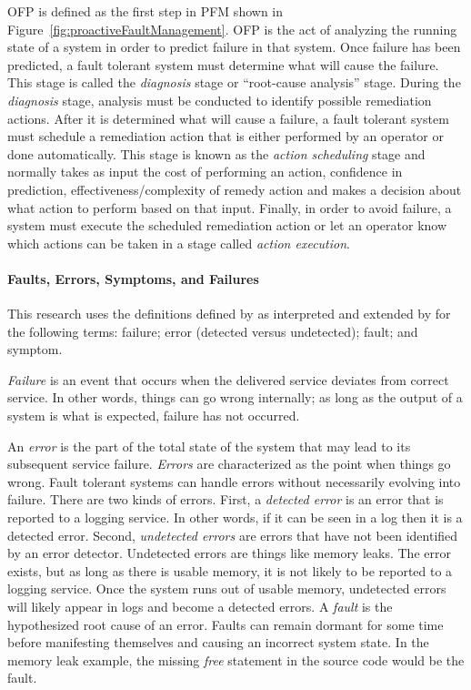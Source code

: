 
\ac{OFP} is defined as the first step in \ac{PFM} shown in
Figure~\ref{fig:proactiveFaultManagement}.  \ac{OFP} is the act of analyzing
the running state of a system in order to predict failure in that system. Once
failure has been predicted, a fault tolerant system must determine what will
cause the failure.  This stage is called the \emph{diagnosis} stage or
``root-cause analysis'' stage.  During the \emph{diagnosis} stage, analysis
must be conducted to identify possible remediation actions.  After it is
determined what will cause a failure, a fault tolerant system must schedule a
remediation action that is either performed by an operator or done
automatically.  This stage is known as the \emph{action scheduling} stage and
normally takes as input the cost of performing an action, confidence in
prediction, effectiveness/complexity of remedy action and makes a decision
about what action to perform based on that input.  Finally, in order to avoid
failure, a system must execute the scheduled remediation action or let an
operator know which actions can be taken in a stage called \emph{action
execution}.

\paragraph{Faults, Errors, Symptoms, and Failures}
This research uses the definitions defined by \citet{avivzienis2004basic} as
interpreted and extended by \citet{salfnerSurvey} for the following terms:
failure; error (detected versus undetected); fault; and symptom.

\emph{Failure} is an event that occurs when the delivered service deviates from
correct service.  In other words, things can go wrong internally; as long as
the output of a system is what is expected, failure has not occurred.  

An \emph{error} is the part of the total state of the system that may lead to
its subsequent service failure.  \emph{Errors} are characterized as the point
when things go wrong.  Fault tolerant systems can handle errors without
necessarily evolving into failure.  There are two kinds of errors.  First, a
\emph{detected error} is an error that is reported to a logging service.  In
other words, if it can be seen in a log then it is a detected error.  Second,
\emph{undetected errors} are errors that have not been identified by an error
detector.  Undetected errors are things like memory leaks.  The error exists,
but as long as there is usable memory, it is not likely to be reported to a
logging service.  Once the system runs out of usable memory, undetected errors
will likely appear in logs and become a detected errors.  A \emph{fault} is the
hypothesized root cause of an error.  Faults can remain dormant for some time
before manifesting themselves and causing an incorrect system state.  In the
memory leak example, the missing \emph{free} statement in the source code would
be the fault.  

